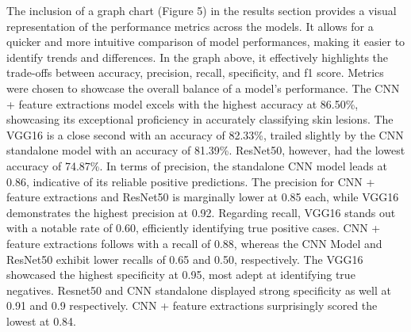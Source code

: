 \documentclass[10pt,twocolumn]{article}
\begin{document}
The inclusion of a graph chart (Figure 5) in the results section provides a visual representation of the performance metrics across the models. It allows for a quicker and more intuitive comparison of model performances, making it easier to identify trends and differences. In the graph above, it effectively highlights the trade-offs between accuracy, precision, recall, specificity, and f1 score. Metrics were chosen to showcase the overall balance of a model's performance. \newline
The CNN + feature extractions model excels with the highest accuracy at 86.50\%, showcasing its exceptional proficiency in accurately classifying skin lesions. The VGG16 is a close second with an accuracy of 82.33\%, trailed slightly by the CNN standalone model with an accuracy of 81.39\%. ResNet50, however, had the lowest accuracy of 74.87\%.
In terms of precision, the standalone CNN model leads at 0.86, indicative of its reliable positive predictions. The precision for CNN + feature extractions and ResNet50 is marginally lower at 0.85 each, while VGG16 demonstrates the highest precision at 0.92. Regarding recall, VGG16 stands out with a notable rate of 0.60, efficiently identifying true positive cases. CNN + feature extractions follows with a recall of 0.88, whereas the CNN Model and ResNet50 exhibit lower recalls of 0.65 and 0.50, respectively. The VGG16 showcased the highest specificity at 0.95, most adept at identifying true negatives. Resnet50 and CNN standalone displayed strong specificity as well at 0.91 and 0.9 respectively. CNN + feature extractions surprisingly scored the lowest at 0.84. \newline
\end{document}
